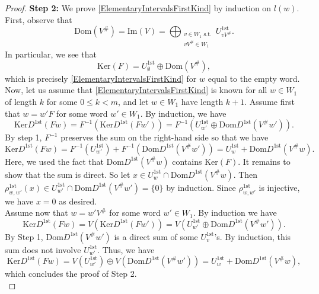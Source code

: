 \documentclass[12pt]{amsart}
\theoremstyle{definition}
\newcommand{\<}{\langle}   %
\renewcommand{\>}{\rangle} %
\begin{document}
\begin{proof}
    \textbf{Step 2:} We prove \eqref{ElementaryIntervalsFirstKind} by induction on $l(w)$. First, observe that
    \begin{equation*}
        \mathrm{Dom}(V^{\#}) = \mathrm{Im}(V) = \bigoplus_{\substack{v \in W_1 \text{ s.t.} \\ vV^{\#} \in W_1}} U^{1\mathrm{st}}_{vV^{\#}}.
    \end{equation*}
     In particular, we see that 
    \begin{equation*}
        \mathrm{Ker}(F) =  U^{1\mathrm{st}}_{\emptyset} \oplus \mathrm{Dom}(V^{\#}),
    \end{equation*}
    which is precisely \eqref{ElementaryIntervalsFirstKind} for $w$ equal to the empty word. Now, let us assume that \eqref{ElementaryIntervalsFirstKind} is known for all $w \in W_1$ of length $k$ for some $0 \leq k < m$, and let $w \in W_1$ have length $k+1$. Assume first that $w = w'F$ for some word $w' \in W_1$. By induction, we have
    \begin{equation*}
        \mathrm{Ker}D^{1\mathrm{st}}(Fw) = F^{-1}(\mathrm{Ker}D^{1\mathrm{st}}(Fw')) = F^{-1}\left( U^{1\mathrm{st}}_{w'} \oplus \mathrm{Dom} D^{1\mathrm{st}}(V^{\#}w')\right).
    \end{equation*}
    By step 1, $F^{-1}$ preserves the sum on the right-hand side so that we have 
    \begin{equation*}
        \mathrm{Ker}D^{1\mathrm{st}}(Fw) = F^{-1}(U^{1\mathrm{st}}_{w'}) + F^{-1}(\mathrm{Dom} D^{1\mathrm{st}}(V^{\#}w')) = U_{w}^{1\mathrm{st}} + \mathrm{Dom}D^{1\mathrm{st}}(V^{\#}w).
    \end{equation*}
    \sloppy Here, we used the fact that $\mathrm{Dom}D^{1\mathrm{st}}(V^{\#}w)$ contains $\mathrm{Ker}(F)$. It remains to show that the sum is direct. So let $x \in U_{w}^{1\mathrm{st}} \cap \mathrm{Dom}D^{1\mathrm{st}}(V^{\#}w)$. Then $\rho_{w,w'}^{1\mathrm{st}}(x) \in U_{w'}^{1\mathrm{st}} \cap \mathrm{Dom} D^{1\mathrm{st}}(V^{\#}w') = \{0\}$ by induction. Since $\rho_{w,w'}^{1\mathrm{st}}$ is injective, we have $x = 0$ as desired. \\
    Assume now that $w = w'V^{\#}$ for some word $w' \in W_1$. By induction we have
    \begin{equation*}
        \mathrm{Ker}D^{1\mathrm{st}}(Fw) = V(\mathrm{Ker}D^{1\mathrm{st}}(Fw')) = V\left( U^{1\mathrm{st}}_{w'} \oplus \mathrm{Dom} D^{1\mathrm{st}}(V^{\#}w')\right).
    \end{equation*}
    By Step 1, $\mathrm{Dom} D^{1\mathrm{st}}(V^{\#}w')$ is a direct sum of some $U^{1\mathrm{st}}_v$'s. By induction, this sum does not involve $U^{1\mathrm{st}}_{w'}$. Thus, we have 
    \begin{equation*}
        \mathrm{Ker}D^{1\mathrm{st}}(Fw) = V(U^{1\mathrm{st}}_{w'}) \oplus V(\mathrm{Dom} D^{1\mathrm{st}}(V^{\#}w')) = U_{w}^{1\mathrm{st}} + \mathrm{Dom}D^{1\mathrm{st}}(V^{\#}w),
    \end{equation*}
    which concludes the proof of Step 2. \\


\end{proof}
\end{document}
